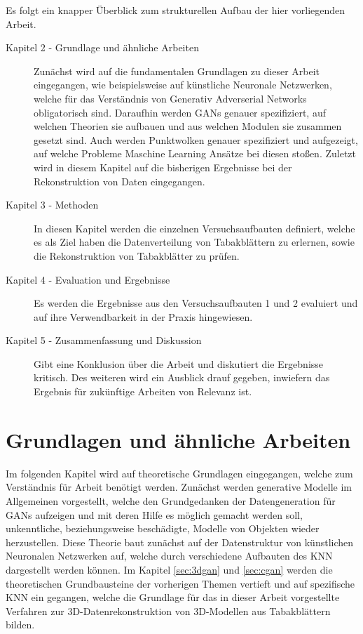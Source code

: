\documentclass{llncs}
\begin{document}
Es folgt ein knapper Überblick zum strukturellen Aufbau der hier vorliegenden Arbeit.
\\
\begin{description}
\item[Kapitel 2 - Grundlage und ähnliche Arbeiten] Zunächst wird auf die fundamentalen Grundlagen zu dieser Arbeit eingegangen, wie beispielsweise auf künstliche Neuronale Netzwerken, welche für das Verständnis von Generativ Adverserial Networks obligatorisch sind. Daraufhin werden GANs genauer spezifiziert, auf welchen Theorien sie aufbauen und aus welchen Modulen sie zusammen gesetzt sind. Auch werden Punktwolken genauer spezifiziert und aufgezeigt, auf welche Probleme Maschine Learning Ansätze bei diesen stoßen. Zuletzt wird in diesem Kapitel auf die bisherigen Ergebnisse bei der Rekonstruktion von Daten eingegangen.\\
\item[Kapitel 3 - Methoden] In diesen Kapitel werden die einzelnen Versuchsaufbauten definiert, welche es als Ziel haben die Datenverteilung von Tabakblättern zu erlernen, sowie die Rekonstruktion von Tabakblätter zu prüfen.\\
\item[Kapitel 4 - Evaluation und Ergebnisse] Es werden die Ergebnisse aus den Versuchsaufbauten 1 und 2 evaluiert und auf ihre Verwendbarkeit in der Praxis hingewiesen.\\
\item[Kapitel 5 - Zusammenfassung und Diskussion] Gibt eine Konklusion über die Arbeit und diskutiert die Ergebnisse kritisch. Des weiteren wird ein Ausblick drauf gegeben, inwiefern das Ergebnis für zukünftige Arbeiten von Relevanz ist. 
\end{description}
\newpage
\section{Grundlagen und ähnliche Arbeiten}
Im folgenden Kapitel wird auf theoretische Grundlagen eingegangen, welche zum Verständnis für Arbeit benötigt werden. Zunächst werden generative Modelle im Allgemeinen vorgestellt, welche den Grundgedanken der Datengeneration für GANs aufzeigen und mit deren Hilfe es möglich gemacht werden soll, unkenntliche, beziehungsweise beschädigte, Modelle von Objekten wieder herzustellen. Diese Theorie baut zunächst auf der Datenstruktur von künstlichen Neuronalen Netzwerken auf, welche durch verschiedene Aufbauten des KNN dargestellt werden können. Im Kapitel \ref{sec:3dgan} und \ref{sec:cgan} werden die theoretischen Grundbausteine der vorherigen Themen vertieft und auf spezifische KNN ein gegangen, welche die Grundlage für das in dieser Arbeit vorgestellte Verfahren zur 3D-Datenrekonstruktion von 3D-Modellen aus Tabakblättern bilden. 
\end{document}
